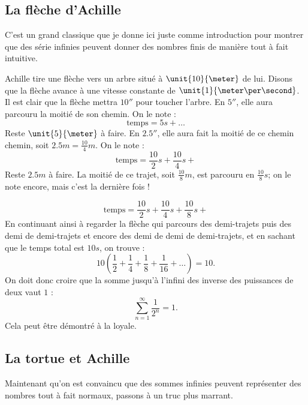 \subsection{La flèche d'Achille}\label{s:un}

C'est un grand classique que je donne ici juste comme introduction pour montrer que des série infinies peuvent donner des nombres finis de manière tout à fait intuitive.

Achille tire une flèche vers un arbre situé à $\unit{10}{\meter}$ de lui. Disons que la flèche avance à une vitesse constante de $\unit{1}{\meter\per\second}$. Il est clair que la flèche mettra $\unit{10}{\second}$ pour toucher l'arbre. En $\unit{5}{\second}$, elle aura parcouru la moitié de son chemin. On le note :
\[
\text{temps}=5s+\ldots
\]
Reste \( \unit{5}{\meter}\) à faire. En $\unit{2.5}{\second}$, elle aura fait la moitié de ce chemin chemin, soit $2.5m=\frac{10}{4}m$. On le note :
\[
\text{temps}=\frac{10}{2}s+\frac{10}{4}s+
\]
Reste $2.5m$ à faire. La moitié de ce trajet, soit $\frac{10}{8}m$, est parcouru en $\frac{10}{8}s$; on le note encore, mais c'est la dernière fois !

\[
\text{temps}=\frac{10}{2}s+\frac{10}{4}s+\frac{10}{8}s+
\]
En continuant ainsi à regarder la flèche qui parcours des demi-trajets puis des demi de demi-trajets et encore des demi de demi de demi-trajets, et en sachant que le temps total est $10s$, on trouve :
\[
10\left( \frac{1}{2}+\frac{1}{4}+\frac{1}{8}+\frac{1}{16}+\ldots  \right)=10.
\]
On doit donc croire que la somme jusqu'à l'infini des inverse des puissances de deux vaut $1$ :
\[
   \sum_{n=1}^{\infty}\frac{1}{2^n}=1.
\]
Cela peut être démontré à la loyale.

\subsection{La tortue et Achille}

Maintenant qu'on est convaincu que des sommes infinies peuvent représenter des nombres tout à fait normaux, passons à un truc plus marrant.

